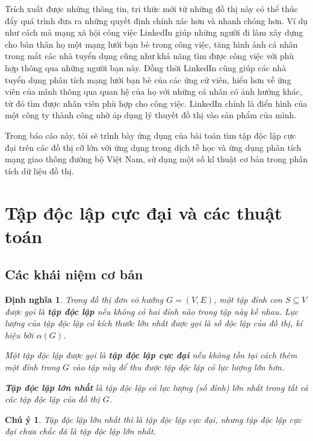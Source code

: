 \documentclass[14pt, oneside, a4paper, openany]{scrartcl}
\newtheorem*{remark}{Chú ý}
\newtheorem{definition}{Định nghĩa}[section]
\begin{document}
Trích xuất được những thông tin, tri thức mới từ những đồ thị này có thể thúc đẩy quá trình đưa ra những quyết định chính xác hơn và nhanh chóng hơn. 
Ví dụ như cách mà mạng xã hội công việc LinkedIn giúp những người đi làm xây dựng cho bản thân họ một mạng lưới bạn bè trong công việc, tăng hình ảnh cá nhân trong mắt các nhà tuyển dụng cũng như khả năng tìm được công việc với phù hợp thông qua những người bạn này. Đồng thời LinkedIn cũng giúp các nhà tuyển dụng phân tích mạng lưới bạn bè của các ứng cử viên, hiểu hơn về ứng viên của mình thông qua quan hệ của họ với những cá nhân có ảnh hưởng khác, từ đó tìm được nhân viên phù hợp cho công việc. LinkedIn chính là điển hình của một công ty thành công nhờ áp dụng lý thuyết đồ thị vào sản phẩm của mình.

Trong báo cáo này, tôi sẽ trình bày ứng dụng của bài toán tìm tập độc lập cực đại trên các đồ thị cỡ lớn với ứng dụng trong dịch tễ học và ứng dụng phân tích mạng giao thông đường bộ Việt Nam, sử dụng một số kĩ thuật cơ bản trong phân tích dữ liệu đồ thị.

\newpage
\section{Tập độc lập cực đại và các thuật toán}
\subsection{Các khái niệm cơ bản}
\begin{definition}
\cite{graphtextbook} Trong đồ thị đơn vô hướng $G = (V,E)$, một tập đỉnh con $S \subseteq V$ được gọi là \textbf{tập độc lập}  nếu không có hai đỉnh nào trong tập này kề nhau. Lực lượng của tập độc lập có kích thước lớn nhất được gọi là số độc lập của đồ thị, kí hiệu bởi $\alpha(G)$.	

Một tập độc lập được gọi là \textbf{tập độc lập cực đại}  nếu không tồn tại cách thêm một đỉnh trong $G$ vào tập này để thu được tập độc lập có lực lượng lớn hơn.

\textbf{Tập độc lập lớn nhất}  là tập độc lập có lực lượng (số đỉnh) lớn nhất trong tất cả các tập độc lập của đồ thị $G$.

\end{definition}
\begin{remark}
Tập độc lập lớn nhất thì là tập độc lập cực đại, nhưng tập độc lập cực đại chưa chắc đã là tập độc lập lớn nhất.	
\end{remark}
\end{document}
